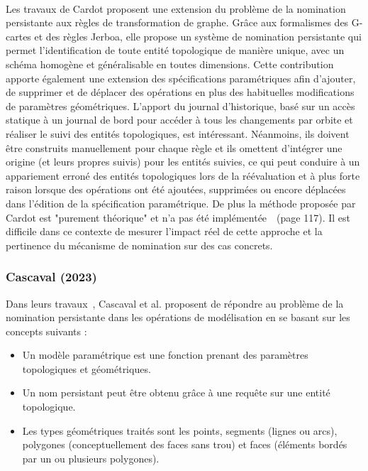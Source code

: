 ~

Les travaux de Cardot proposent une extension du problème de la nomination
persistante aux règles de transformation de graphe. %
Grâce aux formalismes des G-cartes et des règles Jerboa, elle propose un système
de nomination persistante qui permet l'identification de toute entité
topologique de manière unique, avec un schéma homogène et généralisable en
toutes dimensions. %
Cette contribution apporte également une extension des spécifications
paramétriques afin d'ajouter, de supprimer et de déplacer des opérations en plus
des habituelles modifications de paramètres géométriques. %
L'apport du journal d'historique, basé sur un accès statique à un journal de
bord pour accéder à tous les changements par orbite et réaliser le suivi des
entités topologiques, est intéressant. %
Néanmoins, ils doivent être construits manuellement pour chaque règle et ils
omettent d'intégrer une origine (et leurs propres suivis) pour les entités
suivies, ce qui peut conduire à un appariement erroné des entités topologiques
lors de la réévaluation et à plus forte raison lorsque des opérations ont été
ajoutées, supprimées ou encore déplacées dans l'édition de la spécification
paramétrique. De plus la méthode proposée par Cardot est "purement théorique" et
n'a pas été implémentée~\cite{cardot2019}~(page
117). %
Il est difficile dans ce contexte de mesurer l'impact réel de cette approche et
la pertinence du mécanisme de nomination sur des cas concrets.


\subsubsection*{Cascaval (2023) }


Dans leurs travaux~\cite{cascaval2023lineage}, Cascaval et al. proposent de
répondre au problème de la nomination persistante dans les opérations de
modélisation en se basant sur les concepts
suivants :
\begin{itemize}
	\item Un modèle paramétrique est une fonction prenant des paramètres
	      topologiques et géométriques.
	\item Un nom persistant peut être obtenu grâce à une requête sur une entité
	      topologique.
	\item Les types géométriques traités sont les points, segments (lignes ou arcs),
	      polygones (conceptuellement des faces sans trou) et faces (éléments bordés
	      par un ou plusieurs polygones).
\end{itemize}

